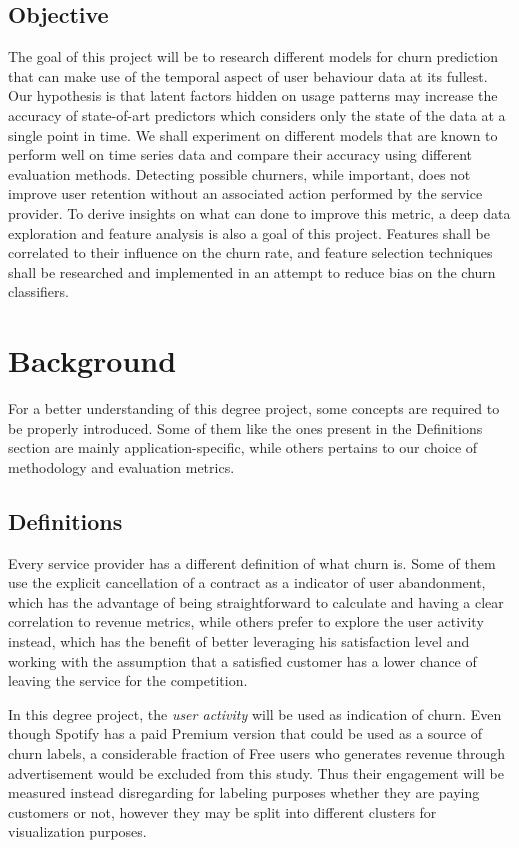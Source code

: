 \documentclass{kththesis}
\begin{document}
\section{Objective}	
	
The goal of this project will be to research different models for churn prediction that can make use of the temporal aspect of user behaviour data at its fullest. Our hypothesis is that latent factors hidden on usage patterns may increase the accuracy of state-of-art predictors which considers only the state of the data at a single point in time. We shall experiment on different models that are known to perform well on time series data and compare their accuracy using different evaluation methods. Detecting possible churners, while important, does not improve user retention without an associated action performed by the service provider. To derive insights on what can done to improve this metric, a deep data exploration and feature analysis is also a goal of this project. Features shall be correlated to their influence on the churn rate, and feature selection techniques shall be researched and implemented in an attempt to reduce bias on the churn classifiers.    

\chapter{Background}

For a better understanding of this degree project, some concepts are required to be properly introduced. Some of them like the ones present in the Definitions section are mainly application-specific, while others pertains to our choice of methodology and evaluation metrics.

\section{Definitions}
\label{sec:definitions}

Every service provider has a different definition of what churn is. Some of them use the explicit cancellation of a contract as a indicator of user abandonment, which has  the advantage of being straightforward to calculate and having a clear correlation to revenue metrics, while others prefer to explore the user activity instead, which has the benefit of better leveraging his satisfaction level and working with the assumption that a satisfied customer has a lower chance of leaving the service for the competition. 

In this degree project, the \emph{user activity} will be used as indication of churn. Even though Spotify has a paid Premium version that could be used as a source of churn labels, a considerable fraction of Free users who generates revenue through advertisement would be excluded from this study. Thus their engagement will be measured instead disregarding for labeling purposes whether they are paying customers or not, however they may be split into different clusters for visualization purposes.
\end{document}
